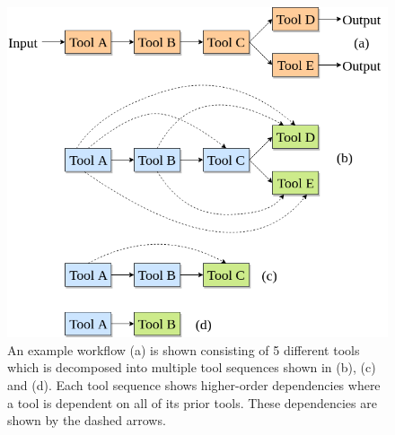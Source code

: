 \documentclass{bioinfo}
\begin{document}
\begin{figure}
\centerline{\includegraphics[scale=0.25]{bioinformatics_journal/images/hod.png}}
\caption{An example workflow (a) is shown consisting of 5 different tools which is decomposed into multiple tool sequences shown in (b), (c) and (d). Each tool sequence shows higher-order dependencies where a tool is dependent on all of its prior tools. These dependencies are shown by the dashed arrows.}\label{figure:01}
\end{figure}
\end{document}

